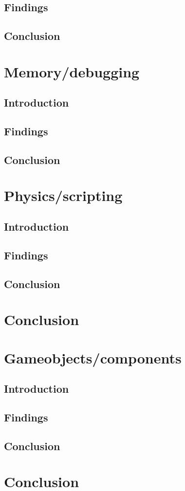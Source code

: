 \documentclass{projdoc}
\begin{document}
\subsection{Findings}

\subsection{Conclusion}

\section{Memory/debugging}

\subsection{Introduction}

\subsection{Findings}

\subsection{Conclusion}

\section{Physics/scripting}

\subsection{Introduction}

\subsection{Findings}

\subsection{Conclusion}

\section{Conclusion}

\section{Gameobjects/components}

\subsection{Introduction}

\subsection{Findings}

\subsection{Conclusion}

\section{Conclusion}
\end{document}
